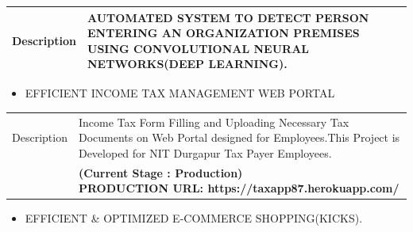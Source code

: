 \documentclass[a4paper,10pt]{article}
\begin{document}
\begin{tabu} to 1.1\textwidth { | X[0.4] | X[3] | }

 
 \hline

\large Description & AUTOMATED SYSTEM
TO DETECT PERSON ENTERING AN ORGANIZATION PREMISES USING CONVOLUTIONAL NEURAL
NETWORKS(DEEP LEARNING).  \\
 
 
\hline

 
\end{tabu}
 
 
 
 
 
  
 
 \begin{itemize}
   \item {\large {EFFICIENT INCOME TAX
MANAGEMENT WEB PORTAL}}
   
 \end{itemize}


\begin{tabu} to 1.1\textwidth { | X[0.4] | X[3] | }

 \hline
\large  Description & Income Tax Form Filling  and Uploading Necessary Tax Documents on Web Portal designed for Employees.This Project is Developed for NIT Durgapur Tax Payer Employees.    \\
 

 

\large     & 

 \textbf{\small(Current Stage : Production)\newline
 \textbf{\small PRODUCTION URL: }https://taxapp87.herokuapp.com/}

\\
\hline

 
\end{tabu}
 
 
 
 
 
 
 
 
 
 
 
 
 \begin{itemize}

   \item {\large {EFFICIENT \& OPTIMIZED E-COMMERCE SHOPPING(KICKS).}}
   
 \end{itemize}
\end{document}
